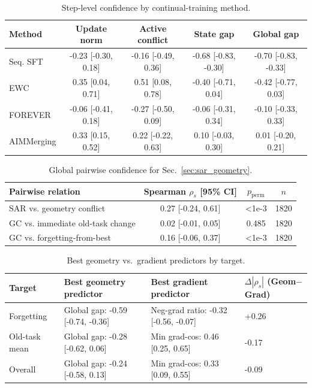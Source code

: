 \documentclass{article}
\begin{document}
\begin{table}[!htbp]
\centering
\caption{{Step-level confidence by continual-training method.}}
\label{tab:app_sec3_conf_step_method}
\scriptsize
\setlength{\tabcolsep}{4pt}
\begin{tabular}{lcccc}
\toprule
Method & Update norm & Active conflict & State gap & Global gap \\
\midrule
Seq. SFT & -0.23 [-0.30, 0.18] & -0.16 [-0.49, 0.36] & -0.68 [-0.83, -0.30] & -0.70 [-0.83, -0.33] \\
EWC & 0.35 [0.04, 0.71] & 0.51 [0.08, 0.78] & -0.40 [-0.71, 0.04] & -0.42 [-0.77, 0.03] \\
FOREVER & -0.06 [-0.41, 0.18] & -0.27 [-0.50, 0.09] & -0.06 [-0.31, 0.34] & -0.10 [-0.33, 0.33] \\
AIMMerging & 0.33 [0.15, 0.52] & 0.22 [-0.22, 0.63] & 0.10 [-0.03, 0.30] & 0.01 [-0.20, 0.21] \\
\bottomrule
\end{tabular}

\end{table}

\begin{table}[!htbp]
\centering
\caption{{Global pairwise confidence for Sec.~\ref{sec:sar_geometry}.}}
\label{tab:app_sec3_conf_pair_global}
\scriptsize
\setlength{\tabcolsep}{4pt}
\begin{tabular}{lccc}
\toprule
Pairwise relation & Spearman $\rho_s$ [95\% CI] & $p_{\mathrm{perm}}$ & $n$ \\
\midrule
SAR vs. geometry conflict & 0.27 [-0.24, 0.61] & <1e-3 & 1820 \\
GC vs. immediate old-task change & 0.02 [-0.01, 0.05] & 0.485 & 1820 \\
GC vs. forgetting-from-best & 0.16 [-0.06, 0.37] & <1e-3 & 1820 \\
\bottomrule
\end{tabular}

\end{table}

\begin{table}[!htbp]
\centering
\caption{{Best geometry vs.\ gradient predictors by target.}}
\label{tab:app_sec3_conf_geo_grad}
\scriptsize
\setlength{\tabcolsep}{4pt}
\begin{tabular}{llll}
\toprule
Target & Best geometry predictor & Best gradient predictor & $\Delta|\rho_s|$ (Geom$-$Grad) \\
\midrule
Forgetting & Global gap: -0.59 [-0.74, -0.36] & Neg-grad ratio: -0.32 [-0.56, -0.07] & +0.26 \\
Old-task mean & Global gap: -0.28 [-0.62, 0.06] & Min grad-cos: 0.46 [0.25, 0.65] & -0.17 \\
Overall & Global gap: -0.24 [-0.58, 0.13] & Min grad-cos: 0.33 [0.09, 0.55] & -0.09 \\
\bottomrule
\end{tabular}

\end{table}
\end{document}
